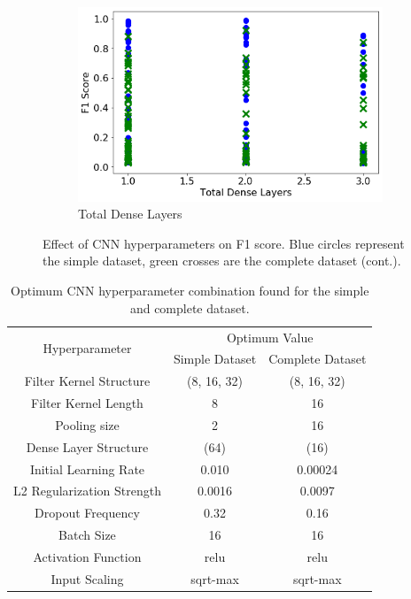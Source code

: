 \begin{figure}
    \begin{subfigure}[t]{0.49\textwidth}
        \centering
        \includegraphics[width=\textwidth]{images/cnn_dense_layers_total.png}
        \caption{Total Dense Layers}
        \label{fig:cnn_total_dense_layers}
    \end{subfigure}

        \caption{Effect of CNN hyperparameters on F1 score. Blue circles represent the simple dataset, green crosses are the complete dataset (cont.).}
        \label{fig:cnn_hyperparameters_f1_score}
\end{figure}

\begin{table}[H]
\centering
\caption{Optimum CNN hyperparameter combination found for the simple and complete dataset.}
\label{table:hyperparameter_dataset_parameters_DNN}
\begin{tabular}{ccc}
\multirow{2}{*}{Hyperparameter} & \multicolumn{2}{c}{Optimum Value} \\
 & Simple Dataset & Complete Dataset \\ \hline
Filter Kernel Structure & (8, 16, 32) & (8, 16, 32) \\
Filter Kernel Length & 8 & 16 \\
Pooling size & 2 & 16 \\
Dense Layer Structure & (64) & (16) \\
Initial Learning Rate & 0.010 & 0.00024 \\
L2 Regularization Strength & 0.0016 & 0.0097 \\
Dropout Frequency & 0.32 & 0.16 \\
Batch Size & 16 & 16 \\
Activation Function & relu & relu \\
Input Scaling & sqrt-max & sqrt-max
\end{tabular}
\end{table}

